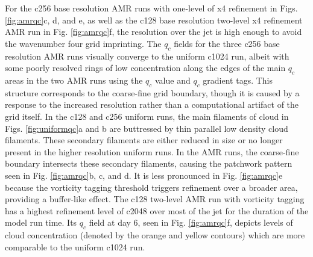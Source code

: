 \documentclass{ametsoc}
\begin{document}
For the c256 base resolution AMR runs with one-level of x4 refinement
in Figs. \ref{fig:amrqc}c, d, and e, as well as the c128 base resolution two-level x4 
refinement AMR run in Fig. \ref{fig:amrqc}f, the resolution over the jet is high enough
to avoid the wavenumber four grid imprinting. The $q_c$ fields for the
 three c256 base resolution AMR runs visually converge to the uniform c1024 run,
 albeit with some poorly resolved rings of low concentration along the edges of the main $q_c$ areas
 in the two AMR runs using the $q_c$ value and $q_c$ gradient tags. This structure
corresponds to the coarse-fine grid boundary, though it is caused by a response to the increased
resolution rather than a computational artifact of the grid itself.
In the c128 and c256 uniform runs, the main filaments of cloud in Figs. \ref{fig:uniformqc}a and b
are buttressed by thin parallel low density cloud filaments. These secondary filaments are either reduced 
in size or no longer present in the higher resolution uniform runs. In the AMR runs, the coarse-fine
boundary intersects these secondary filaments, causing the patchwork pattern seen in
Fig. \ref{fig:amrqc}b, c, and d. It is less pronounced in Fig. \ref{fig:amrqc}e because the vorticity 
tagging threshold triggers refinement over a broader area, providing a buffer-like effect. The c128 two-level
AMR run with vorticity tagging has a highest refinement level of c2048 over most of the jet for the duration of
the model run time. Its $q_c$ field at day 6, seen in Fig. \ref{fig:amrqc}f, depicts levels of cloud 
concentration (denoted by the orange and yellow contours) which are more comparable to the uniform c1024 run.
\end{document}
